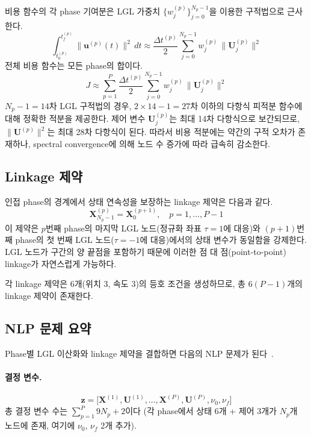\documentclass[11pt]{article}
\begin{document}
비용 함수의 각 phase 기여분은 LGL 가중치 $\{w_j^{(p)}\}_{j=0}^{N_p-1}$을 이용한 구적법으로 근사한다.
\[
\int_{t_0^{(p)}}^{t_f^{(p)}} \|\mathbf{u}^{(p)}(t)\|^2 \, dt \approx \frac{\Delta t^{(p)}}{2} \sum_{j=0}^{N_p-1} w_j^{(p)} \, \|\mathbf{U}_j^{(p)}\|^2
\]
전체 비용 함수는 모든 phase의 합이다.
\begin{equation}
\label{eq:cost}
J \approx \sum_{p=1}^{P} \frac{\Delta t^{(p)}}{2} \sum_{j=0}^{N_p-1} w_j^{(p)} \, \|\mathbf{U}_j^{(p)}\|^2
\end{equation}
$N_p - 1 = 14$차 LGL 구적법의 경우, $2 \times 14 - 1 = 27$차 이하의 다항식 피적분 함수에 대해 정확한 적분을 제공한다.
제어 변수 $\mathbf{U}_j^{(p)}$는 최대 14차 다항식으로 보간되므로, $\|\mathbf{U}^{(p)}\|^2$는 최대 28차 다항식이 된다.
따라서 비용 적분에는 약간의 구적 오차가 존재하나, spectral convergence에 의해 노드 수 증가에 따라 급속히 감소한다.


\subsection{Linkage 제약}
\label{sec:linkage}

인접 phase의 경계에서 상태 연속성을 보장하는 linkage 제약은 다음과 같다.
\begin{equation}
\label{eq:linkage}
\mathbf{X}_{N_p-1}^{(p)} = \mathbf{X}_0^{(p+1)}, \quad p = 1, \ldots, P-1
\end{equation}
이 제약은 $p$번째 phase의 마지막 LGL 노드(정규화 좌표 $\tau = 1$에 대응)와 $(p+1)$번째 phase의 첫 번째 LGL 노드($\tau = -1$에 대응)에서의 상태 변수가 동일함을 강제한다.
LGL 노드가 구간의 양 끝점을 포함하기 때문에 이러한 점 대 점(point-to-point) linkage가 자연스럽게 가능하다.

각 linkage 제약은 6개(위치 3, 속도 3)의 등호 조건을 생성하므로, 총 $6(P-1)$개의 linkage 제약이 존재한다.


\subsection{NLP 문제 요약}
\label{sec:nlp_summary}

Phase별 LGL 이산화와 linkage 제약을 결합하면 다음의 NLP 문제가 된다~\cite{Patterson2014}.

\paragraph{결정 변수.}
\[
\mathbf{z} = \bigl[\boldsymbol{X}^{(1)}, \boldsymbol{U}^{(1)}, \ldots, \boldsymbol{X}^{(P)}, \boldsymbol{U}^{(P)}, \nu_0, \nu_f\bigr]
\]
총 결정 변수 수는 $\sum_{p=1}^{P} 9 N_p + 2$이다 (각 phase에서 상태 6개 + 제어 3개가 $N_p$개 노드에 존재, 여기에 $\nu_0$, $\nu_f$ 2개 추가).
\end{document}
